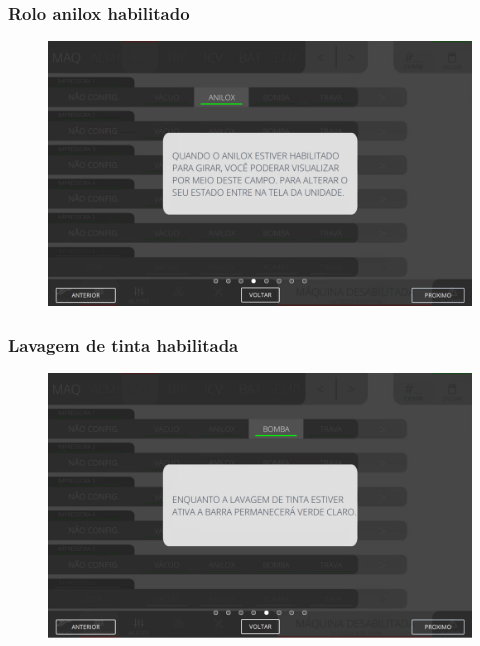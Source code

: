 \newpage
\thispagestyle{fancy}
\vspace*{40 pt}
\subsubsection{\small{Rolo anilox habilitado}} \label{sec:telaComandoImpressorasRoloAniloxHabilitado}
\vspace*{\fill}
\begin{figure}[h]
    \centering
    \includegraphics[width=576 px,height=360 px]{src/imagesICV/04-printters/01-printters/commands/4.png}
\end{figure}
\vspace*{\fill}

\newpage
\thispagestyle{fancy}
\vspace*{40 pt}
\subsubsection{\small{Lavagem de tinta habilitada}} \label{sec:telaComandoImpressorasLavagemDeTintaHabilitada}
\vspace*{\fill}
\begin{figure}[h]
    \centering
    \includegraphics[width=576 px,height=360 px]{src/imagesICV/04-printters/01-printters/commands/5.png}
\end{figure}
\vspace*{\fill}

